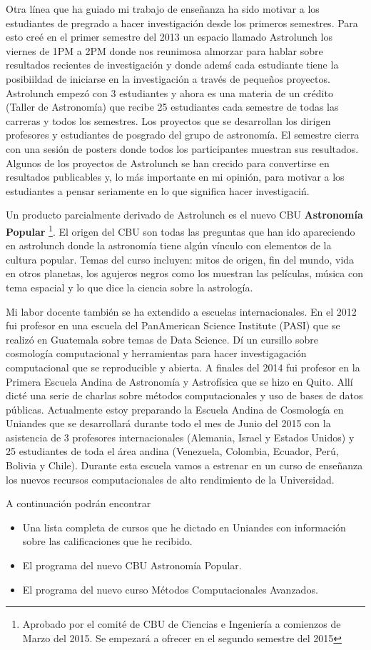 \documentclass[letterpaper,12pt,onecolumn]{article}
\begin{document}
Otra l\'inea que ha guiado mi trabajo de ense\~nanza ha sido motivar a los estudiantes de pregrado a hacer investigaci\'on desde los primeros semestres. Para
esto cre\'e en el primer semestre del 2013 un espacio llamado Astrolunch
los viernes de 1PM a 2PM donde nos reunimosa almorzar para hablar
sobre resultados recientes de investigaci\'on y donde adem\'s cada
estudiante tiene la posibiildad de iniciarse en la investigaci\'on a
trav\'es de peque\~nos proyectos. Astrolunch empez\'o con 3 estudiantes y
ahora es una materia de un cr\'edito (Taller de Astronom\'ia) que recibe
25 estudiantes cada semestre de todas las carreras y todos los
semestres. Los proyectos que se desarrollan los dirigen profesores y
estudiantes de posgrado del grupo de astronomía. El semestre cierra
con una sesi\'on de posters donde todos los participantes muestran sus
resultados. Algunos de los proyectos de Astrolunch se han crecido para
convertirse en resultados publicables y, lo m\'as importante en mi
opini\'on, para motivar a los estudiantes a pensar seriamente en lo
que significa hacer investigaci\' n. 


Un producto parcialmente derivado de Astrolunch es el nuevo CBU {\bf
  Astronom\'ia Popular} \footnote{Aprobado por el comit\'e de CBU de Ciencias e
  Ingenier\'ia a comienzos de Marzo del 2015. Se empezar\'a a ofrecer
  en el segundo semestre del 2015}. El origen del CBU son todas las
preguntas que han ido apareciendo en astrolunch donde la astronom\'ia
tiene alg\'un v\'inculo con elementos de la cultura popular. Temas del
curso incluyen: mitos de origen, fin del mundo, vida en otros planetas,
los agujeros negros como los muestran las pel\'iculas, m\'usica con tema
espacial y lo que dice la ciencia sobre la astrolog\'ia.

Mi labor docente tambi\'en se ha extendido a escuelas
internacionales. En el 2012 fui profesor en una escuela del
PanAmerican Science Institute (PASI) que se realiz\'o en Guatemala sobre
temas de Data Science. D\'i un cursillo sobre cosmología
computacional y herramientas para hacer investigagaci\'on computacional
que se reproducible y abierta. A finales del 2014 fui profesor en la
Primera Escuela Andina de Astronom\'ia y Astrof\'isica que se hizo en
Quito. All\'i dict\'e una serie de charlas sobre m\'etodos computacionales y
uso de bases de datos p\'ublicas. Actualmente estoy preparando la
Escuela Andina de Cosmolog\'ia en Uniandes que se desarrollar\'a durante
todo el mes de Junio del 2015 con la asistencia de 3 profesores
internacionales (Alemania, Israel y Estados Unidos) y 25 estudiantes
de toda el \'area andina (Venezuela, Colombia, Ecuador, Per\'u, Bolivia y
Chile). Durante esta escuela vamos a estrenar en un curso de
ense\~nanza los nuevos recursos computacionales de alto rendimiento de
la Universidad.


A continuaci\'on podr\'an encontrar
\begin{itemize}
\item Una lista completa de cursos que he dictado en Uniandes con
  informaci\'on sobre las calificaciones que he recibido. 
\item El programa del nuevo CBU Astronom\'ia Popular.
\item El programa del nuevo curso M\'etodos Computacionales Avanzados.
\end{itemize}
\end{document}
